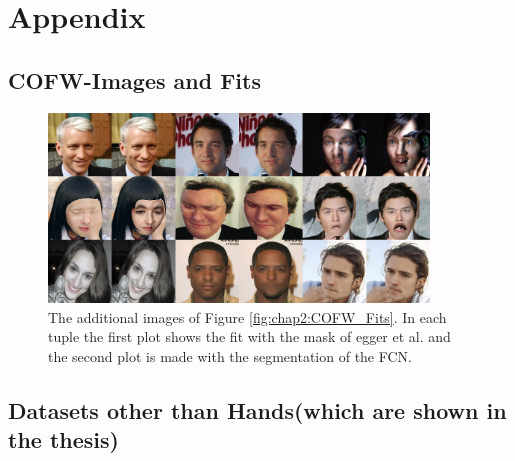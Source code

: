 \chapter{Appendix}

\section{COFW-Images and Fits}
\label{appendix:COFW}

\begin{figure}
	\centering
	\includegraphics[width=0.9\textwidth]{Figures/appendix/COFW_Fits_Appendix.png}
	\caption{The additional images of Figure \ref{fig:chap2:COFW_Fits}. In each tuple the first plot shows the fit with the mask of egger et al. and the second plot is made with the segmentation of the FCN.}
	\label{fig:chap2:COFW_Fits_Appendix}
\end{figure}

\vspace{3cm}

\section{Datasets other than Hands(which are shown in the thesis)}
\label{appendix:otherDatasets}



